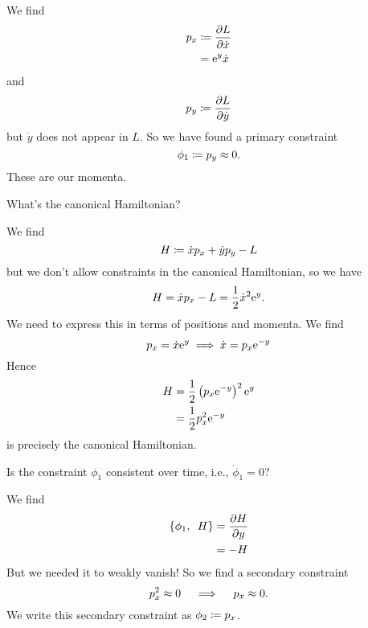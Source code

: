 \begin{soln}
We find
\begin{equation}
\begin{split}
p_{x} &\coloneqq\frac{\partial L}{\partial\dot{x}}\\
&=\mathrm{e}^{y}\dot{x}
\end{split}
\end{equation}
and
\begin{equation}
p_{y} \coloneqq \frac{\partial L}{\partial\dot{y}}
\end{equation}
but $\dot{y}$ does not appear in $L$. So we have found a primary constraint
\begin{equation}
\phi_{1} \coloneqq p_{y}\approx 0.
\end{equation}
These are our momenta.
\end{soln}

 What's the canonical Hamiltonian?

\begin{soln}
We find
\begin{equation}
H \coloneqq \dot{x}p_{x} + \dot{y}p_{y} - L
\end{equation}
but we don't allow constraints in the canonical Hamiltonian, so we have
\begin{equation}
H = \dot{x}p_{x} - L = \frac{1}{2}\dot{x}^{2}\mathrm{e}^{y}.
\end{equation}
We need to express this in terms of positions and momenta. We find
\begin{equation}
p_{x} = \dot{x}\mathrm{e}^{y}\implies \dot{x} = p_{x}\mathrm{e}^{-y}
\end{equation}
Hence
\begin{equation}
\begin{split}
H &= \frac{1}{2}\left(p_{x}\mathrm{e}^{-y}\right)^{2}\mathrm{e}^{y}\\
&=\frac{1}{2}p_{x}^{2}\mathrm{e}^{-y}
\end{split}
\end{equation}
is precisely the canonical Hamiltonian.
\end{soln}

 Is the constraint $\phi_{1}$ consistent over time, i.e., $\dot{\phi}_{1}=0$?

\begin{soln}
We find
\begin{equation}
\begin{split}
\left\{\phi_{1},\enspace H\right\} &= \frac{\partial H}{\partial y}\\
&= -H
\end{split}
\end{equation}
But we needed it to weakly vanish! So we find a secondary constraint
\begin{equation}
p_{x}^{2}\approx 0\quad\implies\quad p_{x}\approx0.
\end{equation}
We write this secondary constraint as $\phi_{2}\coloneqq p_{x}$.
\end{soln}

